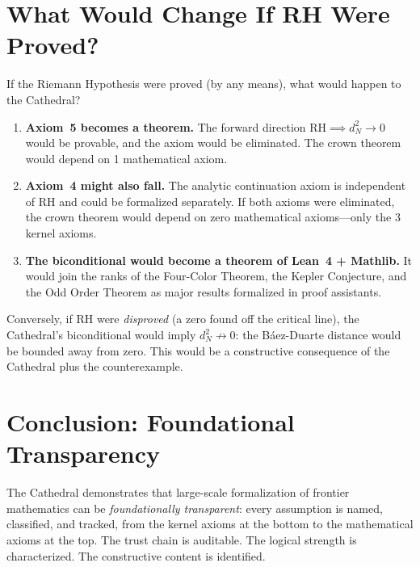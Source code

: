 \documentclass[11pt,a4paper]{article}
\theoremstyle{plain}
\theoremstyle{definition}
\newcommand{\RH}{\ensuremath{\mathrm{RH}}}
\begin{document}
\section{What Would Change If RH Were Proved?}
\label{sec:if}

If the Riemann Hypothesis were proved (by any means), what would
happen to the Cathedral?

\begin{enumerate}
  \item \textbf{Axiom~5 becomes a theorem.} The forward direction
    $\RH \implies d_N^2 \to 0$ would be provable, and the axiom
    would be eliminated. The crown theorem would depend on 1
    mathematical axiom.
  \item \textbf{Axiom~4 might also fall.} The analytic continuation
    axiom is independent of \RH{} and could be formalized separately.
    If both axioms were eliminated, the crown theorem would depend
    on zero mathematical axioms---only the 3 kernel axioms.
  \item \textbf{The biconditional would become a theorem of
    Lean~4 + Mathlib.} It would join the ranks of the Four-Color
    Theorem, the Kepler Conjecture, and the Odd Order Theorem as
    major results formalized in proof assistants.
\end{enumerate}

Conversely, if \RH{} were \emph{disproved} (a zero found off the
critical line), the Cathedral's biconditional would imply
$d_N^2 \not\to 0$: the B\'aez-Duarte distance would be bounded
away from zero. This would be a constructive consequence of the
Cathedral plus the counterexample.

\section{Conclusion: Foundational Transparency}

The Cathedral demonstrates that large-scale formalization of frontier
mathematics can be \emph{foundationally transparent}: every assumption
is named, classified, and tracked, from the kernel axioms at the
bottom to the mathematical axioms at the top. The trust chain is
auditable. The logical strength is characterized. The constructive
content is identified.
\end{document}
